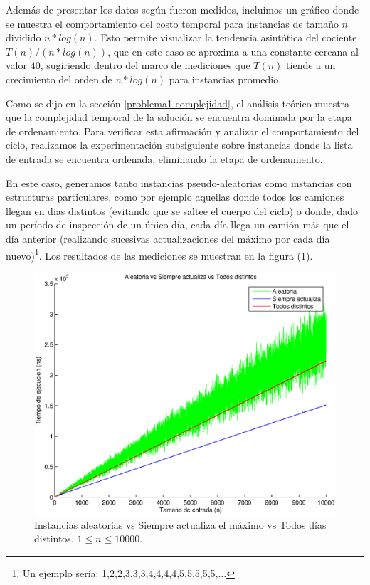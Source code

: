 Además de presentar los datos según fueron medidos, incluimos un gráfico donde se muestra el comportamiento del costo temporal para instancias de tamaño $n$ dividido $n * log(n)$. Esto permite visualizar la tendencia asintótica del cociente $T(n) / (n * log(n))$, que en este caso se aproxima a una constante cercana al valor $40$, sugiriendo dentro del marco de mediciones que $T(n)$ tiende a un crecimiento del orden de $n * log(n)$ para instancias promedio.

Como se dijo en la sección \ref{problema1-complejidad}, el análisis teórico muestra que la complejidad temporal de la solución se encuentra dominada por la etapa de ordenamiento. Para verificar esta afirmación y analizar el comportamiento del ciclo, realizamos la experimentación subsiguiente sobre instancias donde la lista de entrada se encuentra ordenada, eliminando la etapa de ordenamiento.

En este caso, generamos tanto instancias pseudo-aleatorias como instancias con estructuras particulares, como por ejemplo aquellas donde todos los camiones llegan en dias distintos (evitando que se saltee el cuerpo del ciclo) o donde, dado un período de inspección de un único día, cada día llega un camión más que el día anterior (realizando sucesivas actualizaciones del máximo por cada día nuevo)\footnote{Un ejemplo sería: 1,2,2,3,3,3,4,4,4,4,5,5,5,5,5,...}. Los resultados de las mediciones se muestran en la figura (\ref{fig:problema1-ordenadas-comparacion}).

  \begin{figure}[H]
    \begin{center}
    \includegraphics[width=0.6\linewidth]{problema1/graficos/problema1_ordenada_aleatoria_10000_vs_problema1_ordenada_siempre_actualiza_10000_vs_problema1_ordenada_todos_distintos_10000.eps}
    \end{center}
    \caption{Instancias aleatorias vs Siempre actualiza el máximo vs Todos días distintos. $1 \leq n \leq 10000$.}
    \label{fig:problema1-ordenadas-comparacion}
  \end{figure}

